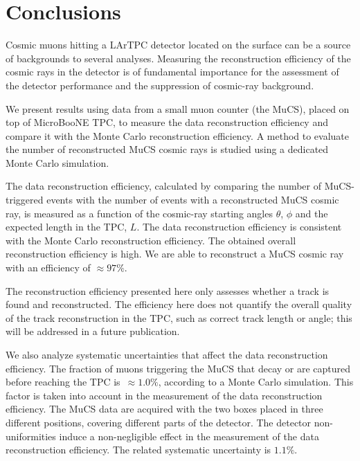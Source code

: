 \documentclass[a4paper,11pt]{article}
\begin{document}
\section{Conclusions}
Cosmic muons hitting a LArTPC detector located on the surface can be a source of backgrounds to several analyses. Measuring the reconstruction efficiency of the cosmic rays in the detector is of fundamental importance for the assessment of the detector performance and the suppression of cosmic-ray background.

We present results using data from a small muon counter (the MuCS), placed on top of MicroBooNE TPC, to measure the data reconstruction efficiency and compare it with the Monte Carlo reconstruction efficiency.
A method to evaluate the number of reconstructed MuCS cosmic rays is studied using a dedicated Monte Carlo simulation.

The data reconstruction efficiency, calculated by comparing the number of MuCS-triggered events with the number of events with a reconstructed MuCS cosmic ray, is measured as a function of the cosmic-ray starting angles $\theta$, $\phi$ and the expected length in the TPC, $L$. The data reconstruction efficiency is consistent with the Monte Carlo reconstruction efficiency. The obtained overall reconstruction efficiency is high. We are able to reconstruct a MuCS cosmic ray with an efficiency of $\approx97\%$.

The reconstruction efficiency presented here only assesses whether a track is found and reconstructed. The efficiency here does not quantify the overall quality of the track reconstruction in the TPC, such as correct track length or angle; this will be addressed in a future publication.

We also analyze systematic uncertainties that affect the data reconstruction efficiency. The fraction of muons triggering the MuCS that decay or are captured before reaching the TPC is~$\approx1.0\%$, according to a Monte Carlo simulation.  This factor is taken into account in the measurement of the data reconstruction efficiency.
The MuCS data are acquired with the two boxes placed in three different positions, covering different parts of the detector. The detector non-uniformities induce a non-negligible effect in the measurement of the data reconstruction efficiency. The related systematic uncertainty is $1.1\%$.
\end{document}
